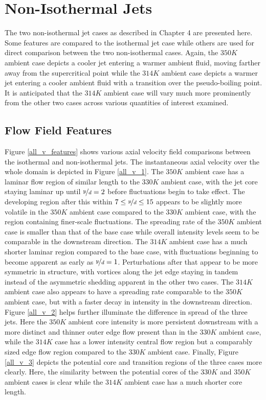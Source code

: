 \section{Non-Isothermal Jets}
The two non-isothermal jet cases as described in Chapter 4 are presented here. Some features are compared to the isothermal jet case while others are used for direct comparison between the two non-isothermal cases. Again, the $350 K$ ambient case depicts a cooler jet entering a warmer ambient fluid, moving farther away from the supercritical point while the $314 K$ ambient case depicts a warmer jet entering a cooler ambient fluid with a transition over the pseudo-boiling point. It is anticipated that the $314 K$ ambient case will vary much more prominently from the other two cases across various quantities of interest examined. 
\subsection{Flow Field Features}
Figure \ref{all_v_features} shows various axial velocity field comparisons between the isothermal and non-isothermal jets. The instantaneous axial velocity over the whole domain is depicted in Figure \ref{all_v_1}. The $350 K$ ambient case has a laminar flow region of similar length to the $330 K $ ambient case, with the jet core staying laminar up until $\nicefrac{y}{d} = 2$ before fluctuations begin to take effect. The developing region after this within $7 \leq \nicefrac{y}{d} \leq 15$ appears to be slightly more volatile in the $350 K$ ambient case compared to the $330 K$ ambient case, with the region containing finer-scale fluctuations. The spreading rate of the $350 K$ ambient case is smaller than that of the base case while overall intensity levels seem to be comparable in the downstream direction. The $314 K$ ambient case has a much shorter laminar region compared to the base case, with fluctuations beginning to become apparent as early as $\nicefrac{y}{d} = 1$. Perturbations after that appear to be more symmetric in structure, with vortices along the jet edge staying in tandem instead of the asymmetric shedding apparent in the other two cases. The $314 K$ ambient case also appears to have a spreading rate comparable to the $350 K$ ambient case, but with a faster decay in intensity in the downstream direction. Figure \ref{all_v_2} helps further illuminate the difference in spread of the three jets. Here the $350 K$ ambient core intensity is more persistent downstream with a more distinct and thinner outer edge flow present than in the $330 K$ ambient case, while the $314 K$ case has a lower intensity central flow region but a comparably sized edge flow region compared to the $330 K$ ambient case. Finally, Figure \ref{all_v_3} depicts the potential core and transition regions of the three cases more clearly. Here, the similarity between the potential cores of the $330 K$ and $350 K$ ambient cases is clear while the $314 K$ ambient case has a much shorter core length. 

